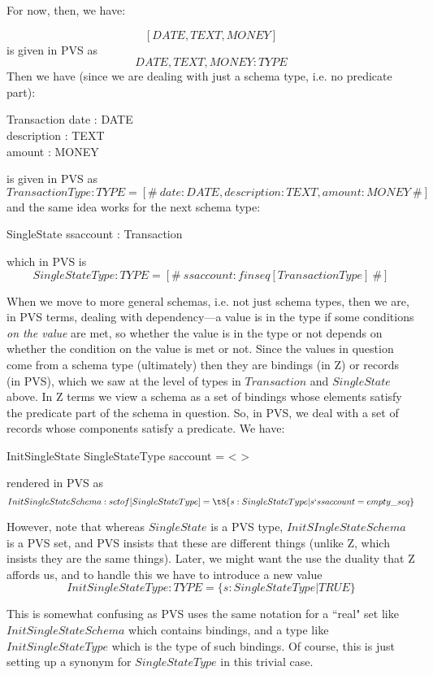 \documentclass[11pt]{amsart}
\begin{document}
For now, then, we have:

\[
[DATE, TEXT, MONEY]
\]
is given in PVS as
\[
DATE, TEXT, MONEY : TYPE
\]
Then we have (since we are dealing with just a schema type, i.e. no predicate part):
\begin{schema}{Transaction}
date : DATE\\
description : TEXT\\
amount : MONEY
\end{schema}
is given in PVS as
\[
TransactionType : TYPE = [\#\ date : DATE, description : TEXT, amount : MONEY\ \#]
\]
and the same idea works for the next schema type:
\begin{schema}{SingleState}
ssaccount : \seq Transaction
\end{schema}
which in PVS is
\[
SingleStateType : TYPE = [\#\ ssaccount :  finseq[TransactionType]\ \#]
\]

When we move to more general schemas, i.e. not just schema types, then we are, in PVS terms, dealing with dependency---a value is in the type if some conditions \emph{on the value} are met, so whether the value is in the type or not depends on whether the condition on the value is met or not. Since the values in question come from a schema type (ultimately) then they are bindings (in Z) or records (in PVS), which we saw at the level of types in $Transaction$ and $SingleState$ above. In Z terms we view a schema as a set of bindings whose elements satisfy the predicate part of the schema in question. So, in PVS, we deal with a set of records whose components satisfy a predicate. We have:

\begin{schema}{InitSingleState}
SingleStateType
\where
saccount = < >
\end{schema}
rendered in PVS as
\[
InitSingleStateSchema : setof[SingleStateType] =\\
\t8 \{ s : SingleStateType | s`ssaccount = empty\_seq\}
\]

However, note that whereas $SingleState$ is a PVS type, $InitSIngleStateSchema$ is a PVS set, and PVS insists that these are different things (unlike Z, which insists they are the same things). Later, we might want the use the duality that Z affords us, and to handle this we have to introduce a new value
\[
InitSingleStateType : TYPE = \{ s : SingleStateType | TRUE \}
\]

This is somewhat confusing as PVS uses the same notation for a ``real" set like $InitSingleStateSchema$ which contains bindings, and a type like $InitSingleStateType$ which is the type of such bindings. Of course, this is just setting up a synonym for $SingleStateType$ in this trivial case.
\end{document}

